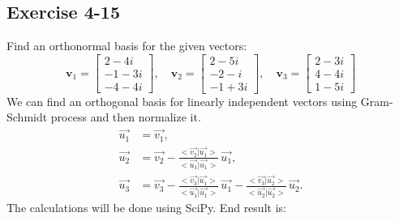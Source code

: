 \documentclass{article}
\begin{document}
        \subsection*{Exercise 4-15}
            Find an orthonormal basis for the given vectors:
            \[
                \mathbf{v}_1 = \begin{bmatrix}
                    2 - 4i \\
                    -1 - 3i \\
                    -4 - 4i
                \end{bmatrix}, \quad
                \mathbf{v}_2 = \begin{bmatrix}
                    2 - 5i \\
                    -2 - i \\
                    -1 + 3i
                \end{bmatrix}, \quad
                \mathbf{v}_3 = \begin{bmatrix}
                    2 - 3i \\
                    4 - 4i \\
                    1 - 5i
                \end{bmatrix}
            \]
            We can find an orthogonal basis for linearly independent vectors using Gram-Schmidt process and then normalize it.
            \begin{align*}
                \vec{u_1} &= \vec{v_1}, \\
                \vec{u_2} &= \vec{v_2} - \frac{<\vec{v_2} | \vec{u_1}>}{<\vec{u_1} | \vec{u_1}>}\, \vec{u_1}, \\
                \vec{u_3} &= \vec{v_3} - \frac{<\vec{v_3} | \vec{u_1}>}{<\vec{u_1} | \vec{u_1}>}\, \vec{u_1} - \frac{<\vec{v_3} | \vec{u_2}>}{<\vec{u_2} | \vec{u_2}>}\, \vec{u_2}.
            \end{align*}
            The calculations will be done using SciPy. End result is:
\end{document}
